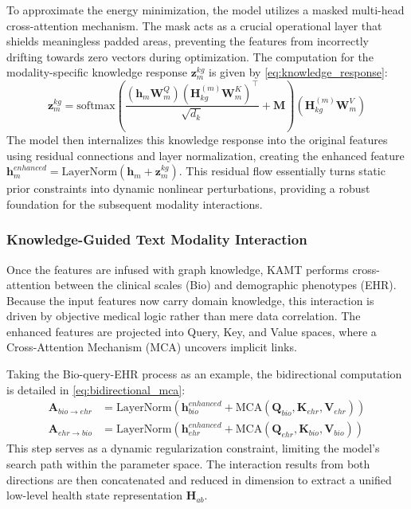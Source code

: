 \documentclass[lettersize,journal]{IEEEtran}
\begin{document}
To approximate the energy minimization, the model utilizes a masked multi-head cross-attention mechanism. The mask acts as a crucial operational layer that shields meaningless padded areas, preventing the features from incorrectly drifting towards zero vectors during optimization. The computation for the modality-specific knowledge response $\mathbf{z}_{m}^{kg}$ is given by \cref{eq:knowledge_response}:
\begin{equation}
\mathbf{z}_{m}^{kg} = \mathrm{softmax}\left( \frac{(\mathbf{h}_m \mathbf{W}_m^Q) (\mathbf{H}_{kg}^{(m)} \mathbf{W}_m^K)^\top}{\sqrt{d_k}} + \mathbf{M} \right) (\mathbf{H}_{kg}^{(m)} \mathbf{W}_m^V)
\label{eq:knowledge_response}
\end{equation}
The model then internalizes this knowledge response into the original features using residual connections and layer normalization, creating the enhanced feature $\mathbf{h}_m^{enhanced} = \mathrm{LayerNorm}(\mathbf{h}_m + \mathbf{z}_{m}^{kg})$. This residual flow essentially turns static prior constraints into dynamic nonlinear perturbations, providing a robust foundation for the subsequent modality interactions.

\subsubsection{Knowledge-Guided Text Modality Interaction}

Once the features are infused with graph knowledge, KAMT performs cross-attention between the clinical scales (Bio) and demographic phenotypes (EHR). Because the input features now carry domain knowledge, this interaction is driven by objective medical logic rather than mere data correlation. The enhanced features are projected into Query, Key, and Value spaces, where a Cross-Attention Mechanism (MCA) uncovers implicit links.

Taking the Bio-query-EHR process as an example, the bidirectional computation is detailed in \cref{eq:bidirectional_mca}:
\begin{equation}
\begin{aligned}
\mathbf{A}_{bio \rightarrow ehr} &= \mathrm{LayerNorm}(\mathbf{h}_{bio}^{enhanced} + \mathrm{MCA}(\mathbf{Q}_{bio}, \mathbf{K}_{ehr}, \mathbf{V}_{ehr})) \\
\mathbf{A}_{ehr \rightarrow bio} &= \mathrm{LayerNorm}(\mathbf{h}_{ehr}^{enhanced} + \mathrm{MCA}(\mathbf{Q}_{ehr}, \mathbf{K}_{bio}, \mathbf{V}_{bio}))
\end{aligned}
\label{eq:bidirectional_mca}
\end{equation}
This step serves as a dynamic regularization constraint, limiting the model's search path within the parameter space. The interaction results from both directions are then concatenated and reduced in dimension to extract a unified low-level health state representation $\mathbf{H}_{ab}$.
\end{document}
